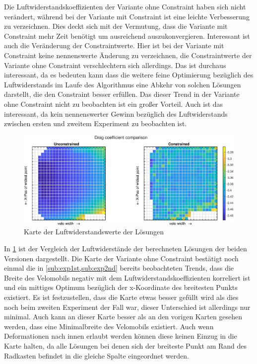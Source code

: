 Die Luftwiderstandskoeffizienten der Variante ohne Constraint haben sich nicht verändert, während bei der Variante mit Constraint ist eine leichte Verbesserung zu verzeichnen.
Dies deckt sich mit der Vermutung, dass die Variante mit Constraint mehr Zeit benötigt um ausreichend auszukonvergieren.
Interessant ist auch die Veränderung der Constraintwerte.
Hier ist bei der Variante mit Constraint keine nennenswerte Änderung zu verzeichnen, die Constraintwerte der Variante ohne Constraint verschlechtern sich allerdings.
Das ist durchaus interessant, da es bedeuten kann dass die weitere feine Optimierung bezüglich des Luftwiderstands im Laufe des Algorithmus eine Abkehr von solchen Lösungen darstellt, die den Constraint besser erfüllen.
Das dieser Trend in der Variante ohne Constraint nicht zu beobachten ist ein großer Vorteil.
Auch ist das interessant, da kein nennenswerter Gewinn bezüglich des Luftwiderstands zwischen ersten und zweitem Experiment zu beobachten ist.

\begin{figure}[h]
	\includegraphics[width=1\linewidth]{bilder/6pt1000Samples/dragMapComparison}
	\caption{Karte der Luftwiderstandswerte der Lösungen}
	\label{fig:3rdmapDrag}
\end{figure}

In \cref{fig:3rdmapDrag} ist der Vergleich der Luftwiderstände der berechneten Lösungen der beiden Versionen dargestellt.
Die Karte der Variante ohne Constraint bestätigt noch einmal die in \cref{sub:exp1st,sub:exp2nd} bereits beobachteten Trends, dass die Breite des Velomobils negativ mit dem Luftwiderstandskoeffizienten korreliert ist und ein mittiges Optimum bezüglich der x-Koordinate des breitesten Punkts existiert.
Es ist festzustellen, dass die Karte etwas besser gefüllt wird als dies noch beim zweiten Experiment der Fall war, dieser Unterschied ist allerdings nur minimal.
Auch kann an dieser Karte besser als an den vorigen Karten gesehen werden, dass eine Minimalbreite des Velomobils existiert.
Auch wenn Deformationen nach innen erlaubt werden können diese keinen Einzug in die Karte halten, da alle Lösungen bei denen sich der breiteste Punkt am Rand des Radkasten befindet in die gleiche Spalte eingeordnet werden.

